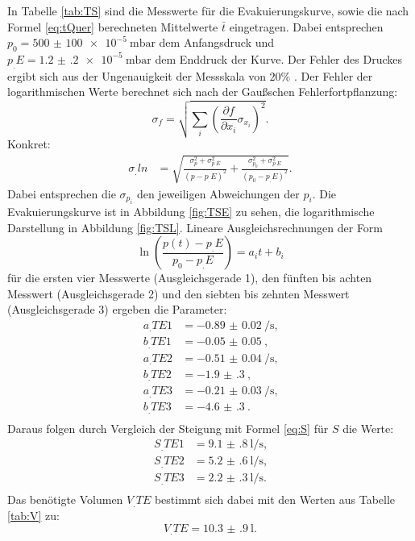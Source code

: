 In Tabelle \ref{tab:TS} sind die Messwerte für die Evakuierungskurve, sowie die nach Formel \eqref{eq:tQuer} berechneten Mittelwerte $\bar{t}$ eingetragen.
Dabei entsprechen $p_0=\SI{500(100)e-5}{\milli\bar}$ dem Anfangsdruck und $p_.E=\SI{1.2(2)e-5}{\milli\bar}$ dem Enddruck der Kurve. Der Fehler des Druckes ergibt sich aus der Ungenauigkeit der Messskala von $20\%$ \cite{V70}. 
Der Fehler der logarithmischen Werte berechnet sich nach der Gaußschen Fehlerfortpflanzung:
\[
\sigma_f = \sqrt{\sum_i\left(\frac{\partial f}{\partial x_i}\sigma_{x_i}\right)^2}\text{.}
\]
Konkret:
\begin{align}
\sigma_.{ln}	&=\sqrt{\frac{\sigma_p^2+\sigma_{p_.E}^2}{(p-p_.E)^2}+\frac{\sigma_{p_0}^2+\sigma_{p_.E}^2}{(p_0-p_.E)^2}}\text{.} \label{eq:ln}
\end{align}
Dabei entsprechen die $\sigma_{p_i}$ den jeweiligen Abweichungen der $p_i$.
Die Evakuierungskurve ist in Abbildung \ref{fig:TSE} zu sehen, die logarithmische Darstellung in Abbildung \ref{fig:TSL}.
Lineare Ausgleichsrechnungen der Form
\[
\ln\left(\frac{p(t)-p_.E}{p_0-p_.E}\right) = a_it+b_i
\]
für die ersten vier Messwerte (Ausgleichsgerade 1), den fünften bis achten Messwert (Ausgleichsgerade 2) und den siebten bis zehnten Messwert (Ausgleichsgerade 3) ergeben die Parameter:
\begin{align*}
a_.{TE1} &= \SI{-0.89(2)}{\per\second} \text{,}\\
b_.{TE1} &= \SI{-0.05(5)}{} \text{,}\\
a_.{TE2} &= \SI{-0.51(4)}{\per\second} \text{,}\\
b_.{TE2} &= \SI{-1.9(3)}{} \text{,}\\
a_.{TE3} &= \SI{-0.21(3)}{\per\second} \text{,}\\
b_.{TE3} &= \SI{-4.6(3)}{} \text{.}\\
\end{align*} 
Daraus folgen durch Vergleich der Steigung mit Formel \eqref{eq:S} für $S$ die Werte:
\begin{align*}
S_.{TE1} &= \SI{9.1(8)}{\litre\per\second} \text{,}\\
S_.{TE2} &= \SI{5.2(6)}{\litre\per\second} \text{,}\\
S_.{TE3} &= \SI{2.2(3)}{\litre\per\second} \text{.}\\
\end{align*} 
Das benötigte Volumen $V_.{TE}$ bestimmt sich dabei mit den Werten aus Tabelle \ref{tab:V} zu:
\[
V_.{TE} = \SI{10.3(9)}{\litre}\text{.}
\]

